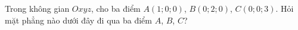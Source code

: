\begin{ex}
Trong không gian $Oxyz$, cho ba điểm $A(1;0;0)$, $B(0;2;0)$, $C(0;0;3)$. Hỏi mặt phẳng nào dưới đây đi qua ba điểm $A$, $B$, $C$?
\end{ex}
